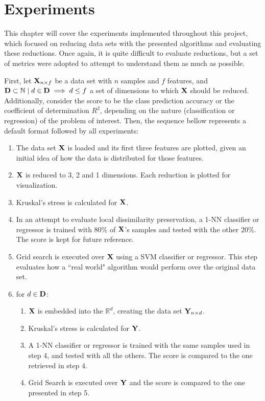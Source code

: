 \chapter{Experiments}
\label{sec:experiments}

This chapter will cover the experiments implemented throughout this project, which focused on reducing data sets with the presented algorithms and evaluating these reductions. Once again, it is quite difficult to evaluate reductions, but a set of metrics were adopted to attempt to understand them as much as possible.

First, let $\mathbf{X}_{n \times f}$ be a data set with $n$ samples and $f$ features, and $\mathbf{D} \subset \mathbb{N} \mid d \in \mathbf{D} \implies d \le f$ a  set of dimensions to which $\mathbf{X}$ should be reduced. Additionally, consider the score to be the class prediction accuracy or the coefficient of determination $R^2$, depending on the nature (classification or regression) of the problem of interest. Then, the sequence bellow represents a default format followed by all experiments:

\begin{enumerate}
	\item The data set $\mathbf{X}$ is loaded and its first three features are plotted, given an initial idea of how the data is distributed for those features.
	\item $\mathbf{X}$ is reduced to 3, 2 and 1 dimensions. Each reduction is plotted for visualization.
	\item Kruskal's stress is calculated for $\mathbf{X}$.
	\item In an attempt to evaluate local dissimilarity preservation, a 1-NN classifier or regressor is trained with 80\% of $\mathbf{X}$'s samples and tested with the other 20\%. The score is kept for future reference.
	\item Grid search is executed over $\mathbf{X}$ using a SVM classifier or regressor. This step evaluates how a ``real world" algorithm would perform over the original data set.
	\item for $d \in \mathbf{D}$:
	\begin{enumerate}
		\item $\mathbf{X}$ is embedded into the $\mathbb{R}^d$, creating the data set $\mathbf{Y}_{n \times d}$.
		\item Kruskal's stress is calculated for $\mathbf{Y}$.
		\item A 1-NN classifier or regressor is trained with the same samples used in step 4, and tested with all the others. The score is compared to the one retrieved in step 4.
		\item Grid Search is executed over $\mathbf{Y}$ and the score is compared to the one presented in step 5.
	\end{enumerate}
\end{enumerate}
\newpage

